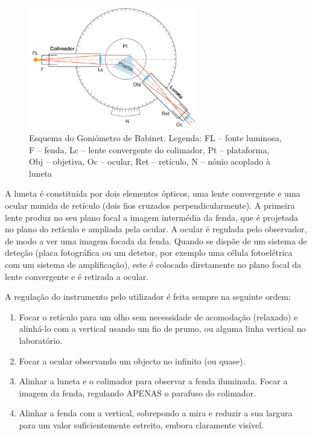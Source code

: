 \documentclass[a4paper,12pt]{article}      %
\begin{document}
\begin{figure}[!htb]  
	\centering 
	\includegraphics[width=0.65\textwidth]{Babinet}
	\caption{Esquema do Goniómetro de Babinet. Legenda: FL -- fonte luminosa, F -- fenda, Lc -- lente convergente do colimador, Pt -- plataforma, Obj -- objetiva, Oc -- ocular, Ret -- retículo, N -- nónio acoplado à luneta\label{fig:babinet}} 
\end{figure}

A luneta é constituída por dois elementos ópticos, uma lente convergente e uma ocular munida de retículo (dois fios cruzados perpendicularmente). A primeira lente produz no seu plano focal a imagem intermédia da fenda, que é projetada no plano do retículo e ampliada pela ocular. A ocular é regulada pelo observador, de modo a ver uma imagem focada da fenda. Quando se dispõe de um sistema de deteção (placa fotográfica ou um detetor, por exemplo uma célula fotoelétrica com um sistema de amplificação), este é colocado diretamente no plano focal da lente convergente e é retirada a ocular.

A regulação do instrumento pelo utilizador é feita sempre na seguinte ordem:
\begin{enumerate}
\item Focar  o retículo para um olho sem necessidade de acomodação (relaxado) e alinhá-lo com a vertical usando um fio de prumo, ou alguma linha vertical no laboratório.
\item Focar a ocular observando um objecto no infinito (ou quase).
\item Alinhar a luneta e o colimador para observar a fenda iluminada. Focar a imagem da fenda, regulando APENAS o parafuso do colimador.
\item Alinhar a fenda com a vertical, sobrepondo a mira e reduzir a sua largura para um valor suficientemente estreito, embora claramente visível.
\end{enumerate}
\end{document}
